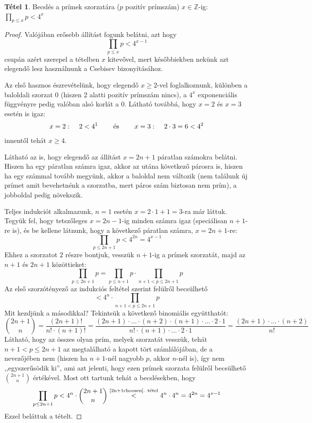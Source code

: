 \documentclass[12pt]{book}
\theoremstyle{plain} %
\theoremstyle{definition} %
\newtheorem{theo/}{Tétel}[section]
\newenvironment{theo}
  {\renewcommand{\qedsymbol}{$\clubsuit$}%
   \pushQED{\qed}\begin{theo/}}
  {\popQED\end{theo/}}
\theoremstyle{remark}
\renewcommand\qedsymbol{$\blacksquare$}
\numberwithin{equation}{section}  %
\def\Z{\mathbb{Z}}
\begin{document}
	\begin{theo}\label{primekszorzata}
		Becslés a prímek szorzatára ($p$ pozitív prímszám) $x\in \Z$-ig: $\displaystyle \prod\limits_{p\leq x} p < 4^x$
	\end{theo}

	\begin{proof}
		Valójában erősebb állítást fogunk belátni, azt hogy
		\[ \prod_{p\leq x} p < 4^{x-1}  \]
		csupán azért szerepel a tételben $x$ kitevővel, mert későbbiekben nekünk azt elegendő lesz használnunk a Csebisev bizonyításához.
		
		Az első hasznos észrevételünk, hogy elegendő $x\geq 2$-vel foglalkoznunk, különben a baloldali szorzat $0$ (hiszen 2 alatti pozitív prímszám nincs), a $4^x$ exponenciális függvényre pedig valóban alsó korlát a $0$. Látható továbbá, hogy $x=2$ és $x=3$ esetén is igaz:
		\[ x=2: \hspace{4mm} 2 < 4^1 \hspace{8mm} \text{és} \hspace{8mm} x=3: \hspace{4mm} 2\cdot 3 = 6 < 4^2  \]
		innentől tehát $x\geq 4$.
		
		Látható az is, hogy elegendő az állítást $x=2n+1$ páratlan számokra belátni. Hiszen ha egy páratlan számra igaz, akkor az utána következő párosra is, hiszen ha egy számmal tovább megyünk, akkor a baloldal nem változik (nem találunk új prímet amit bevehetnénk a szorzatba, mert páros szám biztosan nem prím), a jobboldal pedig növekszik.
		
		Teljes indukciót alkalmazunk, $n=1$ esetén $x=2\cdot 1 + 1 = 3$-ra már láttuk. Tegyük fel, hogy tetszőleges $x=2n-1$-ig minden számra igaz (speciálisan $n+1$-re is), és be kellene látnunk, hogy a következő páratlan számra, $x=2n+1$-re:
		\[ \prod_{p\leq 2n+1} p < 4^{2n} = 4^{x-1}  \]
		Ehhez a szorzatot $2$ részre bontjuk, vesszük $n+1$-ig a prímek szorzatát, majd az $n+1$ és $2n+1$ közöttieket:
		\[  \prod_{p\leq 2n+1} p =  \prod_{p\leq n+1} p \cdot  \prod_{n+1 < p\leq 2n+1} p \]
		Az első szorzótényező az indukciós feltétel szerint felülről becsülhető
		\[ < 4^{n} \cdot  \prod_{n+1 < p\leq 2n+1} p  \]
		Mit kezdjünk a másodikkal? Tekintsük a következő binomiális együtthatót:
		\[ {2n+1\choose n} = \dfrac{(2n+1)!}{n!\cdot (n+1)!} = \dfrac{(2n+1)\cdot \ldots \cdot (n+2)\cdot (n+1)\cdot \ldots \cdot 2\cdot 1}{n! \cdot (n+1) \cdot \ldots \cdot 2 \cdot 1} = \dfrac{(2n+1)\cdot \ldots \cdot (n+2)}{n!}  \]
		Látható, hogy az összes olyan prím, melyek szorzatát vesszük, tehát $n+1<p\leq 2n+1$ az megtalálható a kapott tört számlálójában, de a nevezőjében nem (hiszen ha $n+1$-nél nagyobb $p$, akkor $n$-nél is), így nem ,,egyszerűsödik ki'', ami azt jelenti, hogy ezen prímek szorzata felülről becsülhető ${2n+1\choose n}$ értékével. Most ott tartunk tehát a becslésekben, hogy
		\[ \prod_{p\leq 2n+1} p < 4^n \cdot {2n+1\choose n} \stackrel{\text{\ref{2n+1choosen}. tétel}}{<} 4^n \cdot 4^n = 4^{2n} = 4^{x-1} \]
		Ezzel beláttuk a tételt.
	\end{proof}
\end{document}
